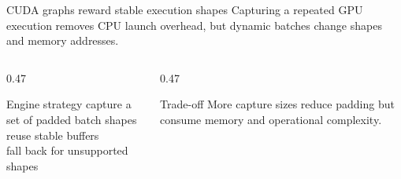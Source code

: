 \documentclass[handout]{beamer}
\begin{document}
\begin{frame}{CUDA graphs reward stable execution shapes}
  Capturing a repeated GPU execution removes CPU launch overhead, but dynamic batches change shapes and memory addresses.
  \begin{columns}[t]
    \begin{column}{0.47\linewidth}
      \begin{block}{Engine strategy}
        capture a set of padded batch shapes\\reuse stable buffers\\fall back for unsupported shapes
      \end{block}
    \end{column}
    \begin{column}{0.47\linewidth}
      \begin{alertblock}{Trade-off}
        More capture sizes reduce padding but consume memory and operational complexity.
      \end{alertblock}
    \end{column}
  \end{columns}
\end{frame}
\end{document}
